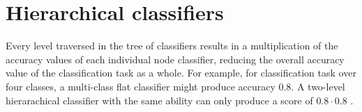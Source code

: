 \documentclass[twocolumn, 9pt]{article}
\begin{document}
\section{Hierarchical classifiers}
Every level traversed in the tree of classifiers results in a multiplication of the accuracy values of each individual node classifier, reducing the overall accuracy value of the classification task as a whole. For example, for classification task over four classes, a multi-class flat classifier might produce accuracy 0.8. A two-level hierarachical classifier with the same ability can only produce a score of $0.8\cdot0.8$ .

  

\end{document}
